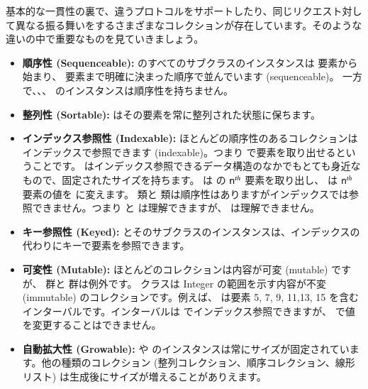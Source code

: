 \documentclass[a4paper,10pt,twoside]{book}
\begin{document}
基本的な一貫性の裏で、違うプロトコルをサポートしたり、同じリクエスト対して異なる振る舞いをするさまざまなコレクションが存在しています。そのような違いの中で重要なものを見ていきましょう。

\begin{itemize}
  \item {\bf 順序性 (Sequenceable):}
   のすべてのサブクラスのインスタンスは  要素から始まり、 要素まで明確に決まった順序で並んでいます (sequenceable)。
  一方で、\mbox{、}\mbox{、} のインスタンスは順序性を持ちません。

  \item {\bf 整列性 (Sortable):}
   はその要素を常に整列された状態に保ちます。

  \item {\bf インデックス参照性 (Indexable):}
        ほとんどの順序性のあるコレクションはインデックスで参照できます (indexable)。つまり  で要素を取り出せるということです。
         はインデックス参照できるデータ構造のなかでもとても身近なもので、固定されたサイズを持ちます。 は  の $\mbox{\ct{n}}^{th}$ 要素を取り出し、 は $\mbox{\ct{n}}^{th}$ 要素の値を  に変えます。
         類と  類は順序性はありますがインデックスでは参照できません。つまり  と  は理解できますが、 は理解できません。

  \item {\bf キー参照性 (Keyed):}
	 とそのサブクラスのインスタンスは、インデックスの代わりにキーで要素を参照できます。

  \item {\bf 可変性 (Mutable):}
        ほとんどのコレクションは内容が可変 (mutable) ですが、 群と  群は例外です。
         クラスは Integer の範囲を示す内容が不変 (immutable) のコレクションです。例えば、 は要素 5, 7, 9, 11,13, 15 を含むインターバルです。インターバルは  でインデックス参照できますが、 で値を変更することはできません。

  \item {\bf 自動拡大性 (Growable):}
          や  のインスタンスは常にサイズが固定されています。他の種類のコレクション (整列コレクション、順序コレクション、線形リスト) は生成後にサイズが増えることがありえます。


\end{itemize}
\end{document}
